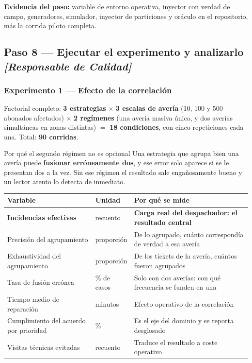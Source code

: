 \documentclass[11pt,a4paper]{article}
\newcommand{\paso}[1]{\subsection{#1}}
\begin{document}
	\textbf{Evidencia del paso:} variable de entorno operativa, inyector con verdad de campo, generadores, simulador, inyector de particiones y oráculo en el repositorio, más la corrida piloto completa.
	
	\paso{Paso 8 --- Ejecutar el experimento y analizarlo \emph{[Responsable de Calidad]}}
	
	\subsubsection{Experimento 1 --- Efecto de la correlación}
	
	Factorial completo: \textbf{3 estrategias} $\times$ \textbf{3 escalas de avería} (10, 100 y 500 abonados afectados) $\times$ \textbf{2 regímenes} (una avería masiva única, y dos averías simultáneas en zonas distintas) $=$ \textbf{18 condiciones}, con cinco repeticiones cada una. Total: \textbf{90 corridas}.
	
	\begin{avisoBox}{Por qué el segundo régimen no es opcional}
		Una estrategia que agrupa bien una avería puede \textbf{fusionar erróneamente dos}, y ese error solo aparece si se le presentan dos a la vez. Sin ese régimen el resultado sale engañosamente bueno y un lector atento lo detecta de inmediato.
	\end{avisoBox}
	
	\begin{center}
		\small
		\begin{tabular}{@{}p{5.2cm}p{3.0cm}p{6.4cm}@{}}
			\toprule
			\textbf{Variable} & \textbf{Unidad} & \textbf{Por qué se mide} \\
			\midrule
			\textbf{Incidencias efectivas} & recuento & \textbf{Carga real del despachador: el resultado central} \\
			Precisión del agrupamiento & proporción & De lo agrupado, cuánto correspondía de verdad a esa avería \\
			Exhaustividad del agrupamiento & proporción & De los tickets de la avería, cuántos fueron agrupados \\
			Tasa de fusión errónea & \% de casos & Solo con dos averías: con qué frecuencia se funden en una \\
			Tiempo medio de reparación & minutos & Efecto operativo de la correlación \\
			Cumplimiento del acuerdo por prioridad & \% & Es el eje del dominio y se reporta desglosado \\
			Visitas técnicas evitadas & recuento & Traduce el resultado a coste operativo \\
			\bottomrule
		\end{tabular}
	\end{center}
	
\end{document}
